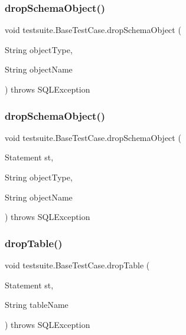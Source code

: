 \subsubsection{\texorpdfstring{drop\+Schema\+Object()}{dropSchemaObject()}\hspace{0.1cm}{\footnotesize\ttfamily [1/2]}}
{\footnotesize\ttfamily void testsuite.\+Base\+Test\+Case.\+drop\+Schema\+Object (\begin{DoxyParamCaption}\item[{String}]{object\+Type,  }\item[{String}]{object\+Name }\end{DoxyParamCaption}) throws S\+Q\+L\+Exception\hspace{0.3cm}{\ttfamily [protected]}}

\mbox{\label{classtestsuite_1_1_base_test_case_a7c25fb4e0676e75d993648ef990ee28f}} 
\subsubsection{\texorpdfstring{drop\+Schema\+Object()}{dropSchemaObject()}\hspace{0.1cm}{\footnotesize\ttfamily [2/2]}}
{\footnotesize\ttfamily void testsuite.\+Base\+Test\+Case.\+drop\+Schema\+Object (\begin{DoxyParamCaption}\item[{Statement}]{st,  }\item[{String}]{object\+Type,  }\item[{String}]{object\+Name }\end{DoxyParamCaption}) throws S\+Q\+L\+Exception\hspace{0.3cm}{\ttfamily [protected]}}

\mbox{\label{classtestsuite_1_1_base_test_case_a84f311adb4febe06deab08a132f85eaf}} 
\subsubsection{\texorpdfstring{drop\+Table()}{dropTable()}\hspace{0.1cm}{\footnotesize\ttfamily [1/2]}}
{\footnotesize\ttfamily void testsuite.\+Base\+Test\+Case.\+drop\+Table (\begin{DoxyParamCaption}\item[{Statement}]{st,  }\item[{String}]{table\+Name }\end{DoxyParamCaption}) throws S\+Q\+L\+Exception\hspace{0.3cm}{\ttfamily [protected]}}

